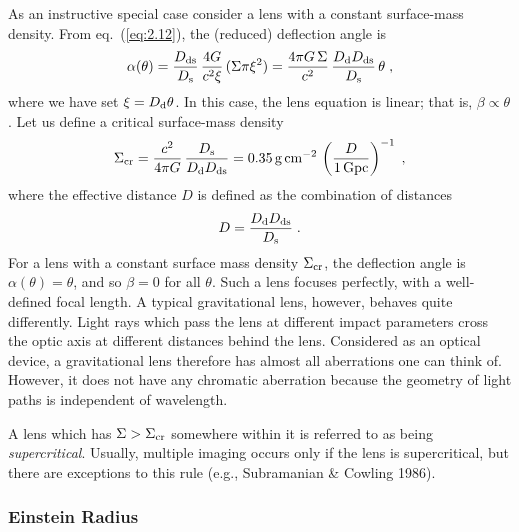 \documentclass[a4paper,10pt]{article} %
\begin{document}
As an instructive special case consider a lens with a constant
surface-mass density. From eq.\ (\ref{eq:2.12}), the (reduced)
deflection angle is
\begin{equation}
  \alpha(\theta) =
  \frac{D_{\rm ds}}{D_{\rm s}}\,\frac{4G}{c^2\xi}\,(\Sigma\pi\xi^2) =
  \frac{4\pi G\,\Sigma}{c^2}\,
  \frac{D_{\rm d}D_{\rm ds}}{D_{\rm s}}\,\theta\;,
\label{eq:2.17}
\end{equation}
where we have set $\xi=D_{\rm d}\theta$. In this case, the lens
equation is linear; that is, $\beta\propto\theta$. Let us define a
critical surface-mass density
\begin{equation}
  \Sigma_{\rm cr} =
  \frac{c^2}{4\pi G}\,\frac{D_{\rm s}}{D_{\rm d}D_{\rm ds}} =
  0.35\,{\rm g}\,{\rm cm}^{-2}\,
  \left(\frac{D}{1\,{\rm Gpc}}\right)^{-1}\;,
\label{eq:2.18}
\end{equation}
where the effective distance $D$ is defined as the combination of
distances
\begin{equation}
  D = \frac{D_{\rm d}D_{\rm ds}}{D_{\rm s}}\;.
\label{eq:2.19}
\end{equation}
For a lens with a constant surface mass density $\Sigma_{\rm cr}$, the
deflection angle is $\alpha(\theta)=\theta$, and so $\beta=0$ for all
$\theta$. Such a lens focuses perfectly, with a well-defined focal
length. A typical gravitational lens, however, behaves quite
differently. Light rays which pass the lens at different impact
parameters cross the optic axis at different distances behind the
lens. Considered as an optical device, a gravitational lens therefore
has almost all aberrations one can think of. However, it does not have
any chromatic aberration because the geometry of light paths is
independent of wavelength.

A lens which has $\Sigma>\Sigma_{\rm cr}$ somewhere within it is
referred to as being {\em supercritical\/}. Usually, multiple imaging
occurs only if the lens is supercritical, but there are exceptions to
this rule (e.g., Subramanian \& Cowling 1986).

\subsubsection{Einstein Radius}
\label{NB:subsubsect2.1.4}
\end{document}
